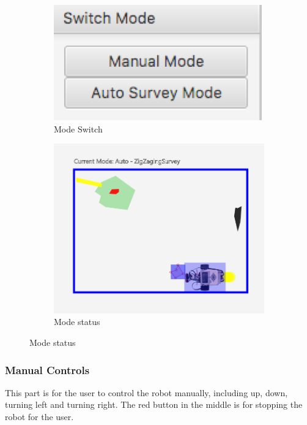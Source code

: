 \documentclass[10pt,a4paper,titlepage]{article}
\begin{document}
\begin{figure}[H]
	\centering
	\begin{subfigure}[t]{0.4\textwidth}
		\includegraphics[width=0.95\linewidth]{mode.png}  
  \caption{Mode Switch} 
\label{fig:Mode Switch}                
	\end{subfigure}
	\begin{subfigure}[t]{0.4\textwidth}
		\includegraphics[width=0.95\linewidth]{status.png}  
  \caption{Mode status} 
\label{fig:Mode status}               
	\end{subfigure}
\end{figure}





  \subsubsection{  Manual Controls} 
This part is for the user to control the robot manually, including up, down, turning left and turning right. The red button in the middle is for stopping the robot for the user.   
   
\end{document}

